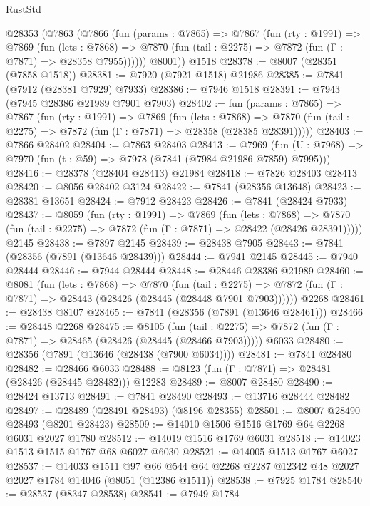 \begin{lexlean}{RustStd}
\begin{coremodule}
    @28353
      (@7863
        (@7866
          (fun (params : @7865) =>
          @7867
            (fun (rty : @1991) =>
            @7869
              (fun (lets : @7868) =>
              @7870 (fun (tail : @2275) => @7872 (fun (Γ : @7871) => @28358 @7955))))))
        @8001))
    @1518
@28378 := @8007 (@28351 (@7858 @1518))
@28381 := @7920 (@7921 @1518) @21986
@28385 := @7841 (@7912 (@28381 @7929) @7933)
@28386 := @7946 @1518
@28391 := @7943 (@7945 @28386 @21989 @7901 @7903)
@28402 := fun (params : @7865) =>
  @7867
    (fun (rty : @1991) =>
    @7869
      (fun (lets : @7868) =>
      @7870 (fun (tail : @2275) => @7872 (fun (Γ : @7871) => @28358 (@28385 @28391)))))
@28403 := @7866 @28402
@28404 := @7863 @28403
@28413 := @7969
    (fun (U : @7968) => @7970 (fun (t : @59) => @7978 (@7841 (@7984 @21986 @7859) @7995)))
@28416 := @28378 (@28404 @28413) @21984
@28418 := @7826 @28403 @28413
@28420 := @8056 @28402 @3124
@28422 := @7841 (@28356 @13648)
@28423 := @28381 @13651
@28424 := @7912 @28423
@28426 := @7841 (@28424 @7933)
@28437 := @8059
    (fun (rty : @1991) =>
    @7869
      (fun (lets : @7868) =>
      @7870 (fun (tail : @2275) => @7872 (fun (Γ : @7871) => @28422 (@28426 @28391)))))
    @2145
@28438 := @7897 @2145
@28439 := @28438 @7905
@28443 := @7841 (@28356 (@7891 (@13646 @28439)))
@28444 := @7941 @2145
@28445 := @7940 @28444
@28446 := @7944 @28444
@28448 := @28446 @28386 @21989
@28460 := @8081
    (fun (lets : @7868) =>
    @7870
      (fun (tail : @2275) =>
      @7872 (fun (Γ : @7871) => @28443 (@28426 (@28445 (@28448 @7901 @7903))))))
    @2268
@28461 := @28438 @8107
@28465 := @7841 (@28356 (@7891 (@13646 @28461)))
@28466 := @28448 @2268
@28475 := @8105
    (fun (tail : @2275) => @7872 (fun (Γ : @7871) => @28465 (@28426 (@28445 (@28466 @7903)))))
    @6033
@28480 := @28356 (@7891 (@13646 (@28438 (@7900 @6034))))
@28481 := @7841 @28480
@28482 := @28466 @6033
@28488 := @8123 (fun (Γ : @7871) => @28481 (@28426 (@28445 @28482))) @12283
@28489 := @8007 @28480
@28490 := @28424 @13713
@28491 := @7841 @28490
@28493 := @13716 @28444 @28482
@28497 := @28489 (@28491 @28493) (@8196 @28355)
@28501 := @8007 @28490 @28493 (@8201 @28423)
@28509 := @14010 @1506 @1516 @1769 @64 @2268 @6031 @2027 @1780
@28512 := @14019 @1516 @1769 @6031
@28518 := @14023 @1513 @1515 @1767 @68 @6027 @6030
@28521 := @14005 @1513 @1767 @6027
@28537 := @14033
    @1511
    @97
    @66
    @544
    @64
    @2268
    @2287
    @12342
    @48
    @2027
    @2027
    @1784
    @14046
    (@8051 (@12386 @1511))
@28538 := @7925 @1784
@28540 := @28537 (@8347 @28538)
@28541 := @7949 @1784

\end{coremodule}
\end{lexlean}
